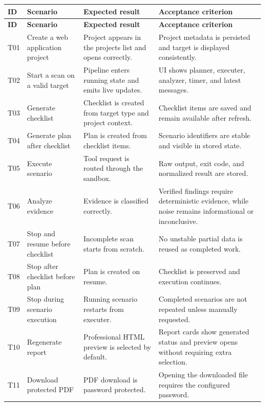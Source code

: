 \documentclass[12pt,a4paper]{report}
\begin{document}
\begin{longtable}{|p{}|p{}|p{}|p{}|}
\hline
\textbf{ID} & \textbf{Scenario} & \textbf{Expected result} & \textbf{Acceptance criterion} \\
\hline
\endfirsthead
\hline
\textbf{ID} & \textbf{Scenario} & \textbf{Expected result} & \textbf{Acceptance criterion} \\
\hline
\endhead
T01 & Create a web application project & Project appears in the projects list and
opens correctly. & Project metadata is persisted and target is displayed consistently. \\
\hline
T02 & Start a scan on a valid target & Pipeline enters running state and emits live
updates. & UI shows planner, executer, analyzer, timer, and latest messages. \\
\hline
T03 & Generate checklist & Checklist is created from target type and project context. &
Checklist items are saved and remain available after refresh. \\
\hline
T04 & Generate plan after checklist & Plan is created from checklist items. & Scenario
identifiers are stable and visible in stored state. \\
\hline
T05 & Execute scenario & Tool request is routed through the sandbox. & Raw output,
exit code, and normalized result are stored. \\
\hline
T06 & Analyze evidence & Evidence is classified correctly. & Verified findings require
deterministic evidence, while noise remains informational or inconclusive. \\
\hline
T07 & Stop and resume before checklist & Incomplete scan starts from scratch. & No
unstable partial data is reused as completed work. \\
\hline
T08 & Stop after checklist before plan & Plan is created on resume. & Checklist is
preserved and execution continues. \\
\hline
T09 & Stop during scenario execution & Running scenario restarts from executer. &
Completed scenarios are not repeated unless manually requested. \\
\hline
T10 & Regenerate report & Professional HTML preview is selected by default. & Report
cards show generated status and preview opens without requiring extra selection. \\
\hline
T11 & Download protected PDF & PDF download is password protected. & Opening the
downloaded file requires the configured password. \\
\hline

\end{longtable}
\end{document}
